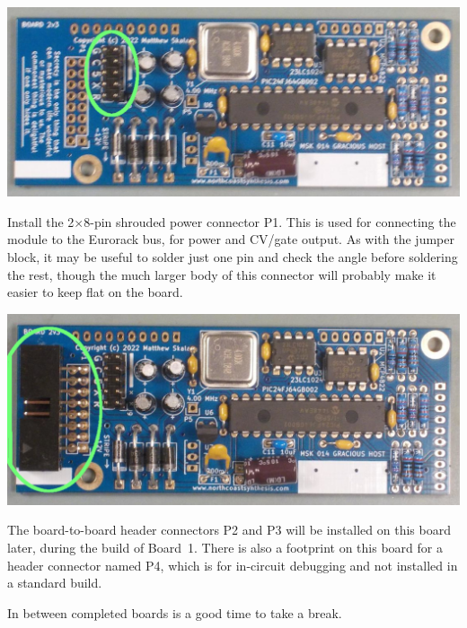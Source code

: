 \nopagebreak
\noindent\includegraphics[width=\linewidth]{jumperblock.jpg}

Install the 2$\times$8-pin shrouded power connector P1.  This is used for
connecting the module to the Eurorack bus, for power and CV/gate output.  As
with the jumper block, it may be useful to solder just one pin and check the
angle before soldering the rest, though the much larger body of this
connector will probably make it easier to keep flat on the board.

\nopagebreak
\noindent\includegraphics[width=\linewidth]{power.jpg}

The board-to-board header connectors P2 and P3 will be installed on this
board later, during the build of Board~1.  There is also a footprint on this
board for a header connector named P4, which is for in-circuit debugging and
not installed in a standard build.

In between completed boards is a good time to take a break.
